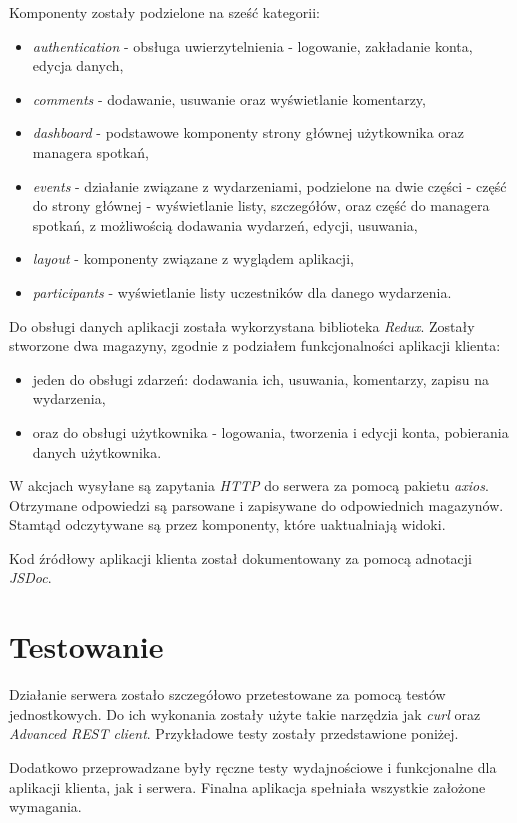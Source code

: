\documentclass[12pt]{article}
\begin{document}
Komponenty zostały podzielone na sześć kategorii:
\begin{itemize}
\item \textit{authentication} - obsługa uwierzytelnienia - logowanie, zakładanie konta, edycja danych,
\item \textit{comments} - dodawanie, usuwanie oraz wyświetlanie komentarzy,
\item \textit{dashboard} - podstawowe komponenty strony głównej użytkownika oraz managera spotkań,
\item \textit{events} - działanie związane z wydarzeniami, podzielone na dwie części - część do strony głównej - wyświetlanie listy, szczegółów, oraz część do managera spotkań, z możliwością dodawania wydarzeń, edycji, usuwania,
\item \textit{layout} - komponenty związane z wyglądem aplikacji,
\item \textit{participants} - wyświetlanie listy uczestników dla danego wydarzenia.
\end{itemize}

Do obsługi danych aplikacji została wykorzystana biblioteka \textit{Redux}. Zostały stworzone dwa magazyny, zgodnie z podziałem funkcjonalności aplikacji klienta: 
\begin{itemize}
\item jeden do obsługi zdarzeń: dodawania ich, usuwania, komentarzy, zapisu na wydarzenia,
\item oraz do obsługi użytkownika - logowania, tworzenia i edycji konta, pobierania danych użytkownika.
\end{itemize}

W akcjach wysyłane są zapytania \textit{HTTP} do serwera za pomocą pakietu \textit{axios}. Otrzymane odpowiedzi są parsowane i zapisywane do odpowiednich magazynów. Stamtąd odczytywane są przez komponenty, które uaktualniają widoki.

Kod źródłowy aplikacji klienta został dokumentowany za pomocą adnotacji \textit{JSDoc}.

\pagebreak
\section{Testowanie}

Działanie serwera zostało szczegółowo przetestowane za pomocą testów jednostkowych. Do ich wykonania zostały użyte takie narzędzia jak \textit{curl} oraz \textit{Advanced REST client}. Przykładowe testy zostały przedstawione poniżej.

Dodatkowo przeprowadzane były ręczne testy wydajnościowe i funkcjonalne dla aplikacji klienta, jak i serwera. Finalna aplikacja spełniała wszystkie założone wymagania.
\end{document}
